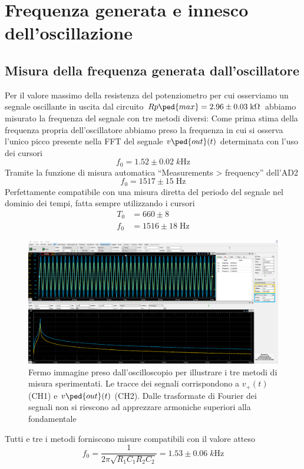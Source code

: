 \documentclass[10pt, a4paper, italian]{article}
\begin{document}
\section{Frequenza generata e innesco dell'oscillazione}
\subsection{Misura della frequenza generata dall'oscillatore}
Per il valore massimo della resistenza del potenziometro per cui osserviamo
un segnale oscillante in uscita dal circuito
$Rp\ped{max} = 2.96 \pm 0.03 \; \si{k\ohm}$ abbiamo misurato la frequenza del
segnale con tre metodi diversi:
Come prima stima della frequenza propria dell'oscillatore abbiamo preso la
frequenza in cui si osserva l'unico picco presente nella FFT del segnale
$v\ped{out} (t)$ determinata con l'uso dei cursori
\[
f_0 = 1.52 \pm 0.02 \; \si{k\Hz}
\]
Tramite la funzione di misura automatica ``Measurements > frequency''
dell'AD2
\[
f_0 = 1517 \pm 15 \; \si{\Hz}
\]
Perfettamente compatibile con una misura diretta del periodo del segnale nel
dominio dei tempi, fatta sempre utilizzando i cursori
\begin{align*}
T_0 &= 660 \pm 8 \\
f_0 &= 1516 \pm 18 \; \si{\Hz}
\end{align*}

\begin{figure}[htbp]
	\centering
	\includegraphics[scale=0.335]{Rpminosc}
	\caption{Fermo immagine preso dall'oscilloscopio per illustrare i tre
	metodi di misura sperimentati. Le tracce dei segnali corrispondono a
	$v_+ (t)$ (CH1) e $v\ped{out} (t)$ (CH2). Dalle trasformate di Fourier dei
	segnali non si riescono ad apprezzare armoniche superiori alla fondamentale
	 \label{fig: Rpmin}}
\end{figure}

Tutti e tre i metodi forniscono misure compatibili con il valore atteso
\begin{equation}\label{eq: f0exp}
f_0 = \frac{1}{2 \pi \sqrt{R_1 C_1 R_2 C_2}} = 1.53 \pm 0.06 \; \si{k\Hz}
\end{equation}
\end{document}
